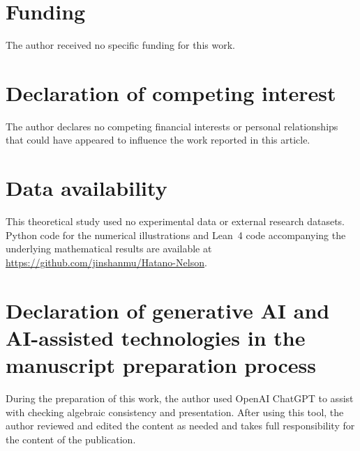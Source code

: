 \documentclass[a4paper,preprint,12pt,nopreprintline,sort&compress]{elsarticle}
\numberwithin{equation}{section}
\theoremstyle{remark}
\begin{document}
\section*{Funding}

The author received no specific funding for this work.

\section*{Declaration of competing interest}

The author declares no competing financial interests or personal
relationships that could have appeared to influence the work reported in
this article.

\section*{Data availability}

This theoretical study used no experimental data or external research
datasets.  Python code for the numerical illustrations and Lean~4 code
accompanying the underlying mathematical results are available at
\url{https://github.com/jinshanmu/Hatano-Nelson}.

\section*{Declaration of generative AI and AI-assisted technologies in the
manuscript preparation process}

During the preparation of this work, the author used OpenAI ChatGPT to
assist with checking algebraic consistency and presentation.  After using
this tool, the author reviewed and edited the content as needed and takes full
responsibility for the content of the publication.



\end{document}
